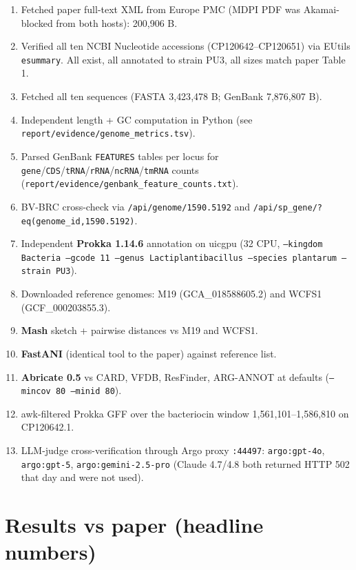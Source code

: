 \documentclass[11pt,a4paper]{article}
\begin{document}
\begin{enumerate}[leftmargin=*]
\item Fetched paper full-text XML from Europe PMC (MDPI PDF was
      Akamai-blocked from both hosts): 200{,}906 B.
\item Verified all ten NCBI Nucleotide accessions (CP120642--CP120651) via
      EUtils \texttt{esummary}. All exist, all annotated to strain PU3, all
      sizes match paper Table 1.
\item Fetched all ten sequences (FASTA 3{,}423{,}478 B; GenBank 7{,}876{,}807 B).
\item Independent length + GC computation in Python (see
      \texttt{report/evidence/genome\_metrics.tsv}).
\item Parsed GenBank \texttt{FEATURES} tables per locus for
      \texttt{gene}/\texttt{CDS}/\texttt{tRNA}/\texttt{rRNA}/\texttt{ncRNA}/\texttt{tmRNA} counts
      (\texttt{report/evidence/genbank\_feature\_counts.txt}).
\item BV-BRC cross-check via
      \verb|/api/genome/1590.5192| and \verb|/api/sp_gene/?eq(genome_id,1590.5192)|.
\item Independent \textbf{Prokka 1.14.6} annotation on uicgpu (32 CPU,
      \texttt{--kingdom Bacteria --gcode 11 --genus Lactiplantibacillus
      --species plantarum --strain PU3}).
\item Downloaded reference genomes: M19 (GCA\_018588605.2) and WCFS1
      (GCF\_000203855.3).
\item \textbf{Mash} sketch + pairwise distances vs M19 and WCFS1.
\item \textbf{FastANI} (identical tool to the paper) against reference list.
\item \textbf{Abricate 0.5} vs CARD, VFDB, ResFinder, ARG-ANNOT at defaults
      (\texttt{--mincov 80 --minid 80}).
\item awk-filtered Prokka GFF over the bacteriocin window
      1{,}561{,}101--1{,}586{,}810 on CP120642.1.
\item LLM-judge cross-verification through Argo proxy \verb|:44497|:
      \texttt{argo:gpt-4o}, \texttt{argo:gpt-5}, \texttt{argo:gemini-2.5-pro}
      (Claude 4.7/4.8 both returned HTTP 502 that day and were not used).
\end{enumerate}

\section{Results vs paper (headline numbers)}
\end{document}
